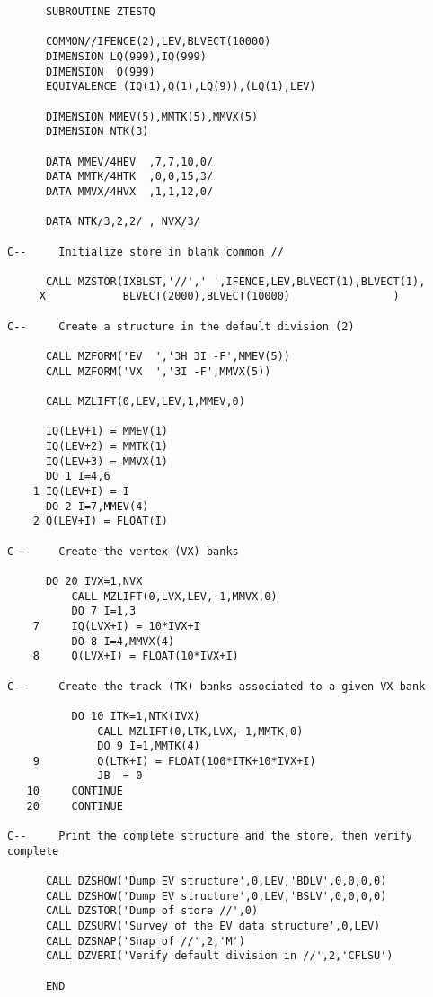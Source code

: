 \begin{verbatim}
      SUBROUTINE ZTESTQ
 
      COMMON//IFENCE(2),LEV,BLVECT(10000)
      DIMENSION LQ(999),IQ(999)
      DIMENSION  Q(999)
      EQUIVALENCE (IQ(1),Q(1),LQ(9)),(LQ(1),LEV)
 
      DIMENSION MMEV(5),MMTK(5),MMVX(5)
      DIMENSION NTK(3)
 
      DATA MMEV/4HEV  ,7,7,10,0/
      DATA MMTK/4HTK  ,0,0,15,3/
      DATA MMVX/4HVX  ,1,1,12,0/
 
      DATA NTK/3,2,2/ , NVX/3/
 
C--     Initialize store in blank common //
 
      CALL MZSTOR(IXBLST,'//',' ',IFENCE,LEV,BLVECT(1),BLVECT(1),
     X            BLVECT(2000),BLVECT(10000)                )
 
C--     Create a structure in the default division (2)
 
      CALL MZFORM('EV  ','3H 3I -F',MMEV(5))
      CALL MZFORM('VX  ','3I -F',MMVX(5))
 
      CALL MZLIFT(0,LEV,LEV,1,MMEV,0)
 
      IQ(LEV+1) = MMEV(1)
      IQ(LEV+2) = MMTK(1)
      IQ(LEV+3) = MMVX(1)
      DO 1 I=4,6
    1 IQ(LEV+I) = I
      DO 2 I=7,MMEV(4)
    2 Q(LEV+I) = FLOAT(I)
 
C--     Create the vertex (VX) banks
 
      DO 20 IVX=1,NVX
          CALL MZLIFT(0,LVX,LEV,-1,MMVX,0)
          DO 7 I=1,3
    7     IQ(LVX+I) = 10*IVX+I
          DO 8 I=4,MMVX(4)
    8     Q(LVX+I) = FLOAT(10*IVX+I)
 
C--     Create the track (TK) banks associated to a given VX bank
 
          DO 10 ITK=1,NTK(IVX)
              CALL MZLIFT(0,LTK,LVX,-1,MMTK,0)
              DO 9 I=1,MMTK(4)
    9         Q(LTK+I) = FLOAT(100*ITK+10*IVX+I)
              JB  = 0
   10     CONTINUE
   20     CONTINUE
 
C--     Print the complete structure and the store, then verify complete
 
      CALL DZSHOW('Dump EV structure',0,LEV,'BDLV',0,0,0,0)
      CALL DZSHOW('Dump EV structure',0,LEV,'BSLV',0,0,0,0)
      CALL DZSTOR('Dump of store //',0)
      CALL DZSURV('Survey of the EV data structure',0,LEV)
      CALL DZSNAP('Snap of //',2,'M')
      CALL DZVERI('Verify default division in //',2,'CFLSU')
 
      END
\end{verbatim}

